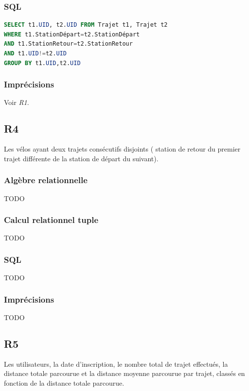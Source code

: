 \documentclass[a4paper, 12pt]{report}
\begin{document}
\subsubsection*{SQL}
\begin{lstlisting}[language=sql]
SELECT t1.UID, t2.UID FROM Trajet t1, Trajet t2
WHERE t1.StationDépart=t2.StationDépart
AND t1.StationRetour=t2.StationRetour
AND t1.UID!=t2.UID
GROUP BY t1.UID,t2.UID
\end{lstlisting}

\subsubsection*{Imprécisions}

Voir \textit{R1}.

\subsection*{R4}

Les vélos ayant deux trajets consécutifs disjoints ( station de retour du premier trajet différente de la station de départ du suivant).
\subsubsection*{Algèbre relationnelle}

TODO %

\subsubsection*{Calcul relationnel tuple}

TODO %

\subsubsection*{SQL}
TODO%

\subsubsection*{Imprécisions}

TODO%

\subsection*{R5}

Les utilisateurs, la date d'inscription, le nombre total de trajet effectués, la distance totale parcourue et la distance moyenne parcourue par trajet, classés en fonction de la distance totale parcourue.
\end{document}
